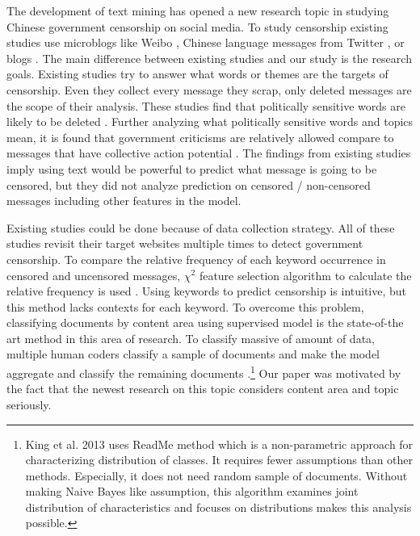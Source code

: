 \documentclass{sig-alternate-05-2015}
\begin{document}
The development of text mining has opened a new research topic in studying Chinese government censorship on social media. To study censorship existing studies use microblogs like Weibo \cite{bamman2012censorship, Fu2013a}, Chinese language messages from Twitter \cite{bamman2012censorship}, or blogs \cite{king2013censorship}. The main difference between existing studies and our study is the research goals. Existing studies try to answer what words \cite{bamman2012censorship, Fu2013a} or themes \cite{king2013censorship} are the targets of censorship. Even they collect every message they scrap, only deleted messages are the scope of their analysis. These studies find that politically sensitive words are likely to be deleted \cite{bamman2012censorship, Fu2013a}. Further analyzing what politically sensitive words and topics mean, it is found that government criticisms are relatively allowed compare to messages that have collective action potential \cite{king2013censorship}. The findings from existing studies imply using text would be powerful to predict what message is going to be censored, but they did not analyze prediction on censored / non-censored messages including other features in the model. 

Existing studies could be done because of data collection strategy. All of these studies revisit their target websites multiple times to detect government censorship. To compare the relative frequency of each keyword occurrence in censored and uncensored messages, $\chi^2$ feature selection algorithm to calculate the relative frequency is used \cite{Fu2013a}. Using keywords to predict censorship is intuitive, but this method lacks contexts for each keyword. To overcome this problem, classifying documents by content area using supervised model is the state-of-the art method in this area of research. To classify massive of amount of data, multiple human coders classify a sample of documents and make the model aggregate and classify the remaining documents \cite{king2013censorship}.\footnote{King et al. 2013 \cite{king2013censorship} uses ReadMe \cite{hopkins2010method} method which is a non-parametric approach for characterizing distribution of classes. It requires fewer assumptions than other methods. Especially, it does not need random sample of documents. Without making Naive Bayes like assumption, this algorithm examines joint distribution of characteristics  and focuses on distributions makes this analysis possible.} Our paper was motivated by the fact that the newest research on this topic considers content area and topic seriously.
\end{document}
